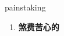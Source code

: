 
\begin{frame}
{\huge painstaking}
\begin{center}
\begin{enumerate}\Large
  \item \textbf{煞费苦心的}
\end{enumerate}
\end{center}
\end{frame}

